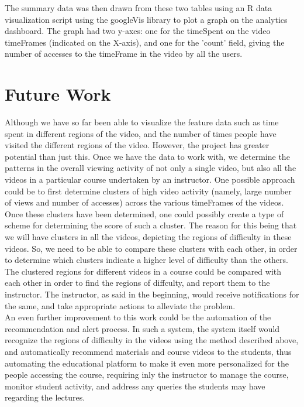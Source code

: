 \documentclass[16pt]{report}
\begin{document}
The summary data was then drawn from these two tables using an R data visualization script using the googleVis library to plot a graph on the analytics dashboard. The graph had two y-axes: one for the timeSpent on the video timeFrames (indicated on the X-axis), and one for the 'count' field, giving the number of accesses to the timeFrame in the video by all the users.












\section{Future Work}

Although we have so far been able to visualize the feature data such as time spent in different regions of the video, and the number of times people have visited the different regions of the video. However, the project has greater potential than just this. Once we have the data to work with, we determine the patterns in the overall viewing activity of not only a single video, but also all the videos in a particular course undertaken by an instructor. One possible approach could be to first determine clusters of high video activity (namely, large number of views and number of accesses) across the various timeFrames of the videos. Once these clusters have been determined, one could possibly create a type of scheme for determining the score of such a cluster. The reason for this being that we will have clusters in all the videos, depicting the regions of difficulty in these videos. So, we need to be able to compare these clusters with each other, in order to determine which clusters indicate a higher level of difficulty than the others.
The clustered regions for different videos in a course could be compared with each other in order to find the regions of diffculty, and report them to the instructor. The instructor, as said in the beginning, would receive notifications for the same, and take appropriate actions to alleviate the problem.\\

An even further improvement to this work could be the automation of the recommendation and alert process. In such a system, the system itself would recognize the regions of difficulty in the videos using the method described above, and automatically recommend materials and course videos to the students, thus automating the educational platform to make it even more personalized for the people accessing the course, requiring inly the instructor to manage the course, monitor student activity, and address any queries the students may have regarding the lectures.
\end{document}
